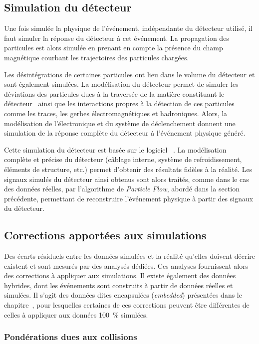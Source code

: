 \subsection{Simulation du détecteur}\label{chapter-LHC-section-MC-subsec-detector_sim}
Une fois simulée la physique de l'événement, indépendante du détecteur utilisé, il faut simuler la réponse du détecteur à cet événement.
La propagation des particules est alors simulée en prenant en compte la présence du champ magnétique courbant les trajectoires des particules chargées.
\par Les désintégrations de certaines particules ont lieu dans le volume du détecteur et sont également simulées.
La modélisation du détecteur permet de simuler les déviations des particules dues à la traversée de la matière constituant le détecteur~\cite{moliere_scat_1,moliere_scat_2} ainsi que les interactions propres à la détection de ces particules comme les traces, les gerbes électromagnétiques et hadroniques.
Alors, la modélisation de l'électronique et du système de déclenchement donnent une simulation de la réponse complète du détecteur à l'événement physique généré.
\par Cette simulation du détecteur est basée sur le logiciel
\GEANTfour~\cite{geant4_2003,geant4_2006,geant4_2016}.
La modélisation complète et précise du détecteur (câblage interne, système de refroidissement, éléments de structure, etc.) permet d'obtenir des résultats fidèles à la réalité.
Les signaux simulés du détecteur ainsi obtenus sont alors traités, comme dans le cas des données réelles, par l'algorithme de \emph{Particle Flow}, abordé dans la section précédente, permettant de reconstruire l'événement physique à partir des signaux du détecteur.
\subsection{Corrections apportées aux simulations}
Des écarts résiduels entre les données simulées et la réalité qu'elles doivent décrire existent et sont mesurés par des analysés dédiées.
Ces analyses fournissent alors des corrections à appliquer aux simulations.
Il existe également des données hybrides, dont les événements sont construits à partir de données réelles et simulées.
Il s'agit des données dites \og encapsulées \fg{} (\emph{embedded}) présentées dans le chapitre~, pour lesquelles certaines de ces corrections peuvent être différentes de celles à appliquer aux données \SI{100}{\%} simulées.
\subsubsection{Pondérations dues aux collisions}
